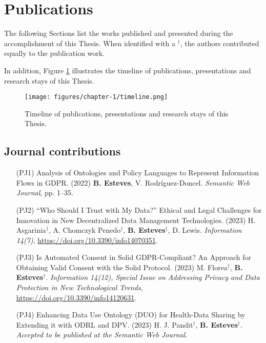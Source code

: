 \section{Publications}
\label{sec:publications}

The following Sections list the works published and presented during the accomplishment of this Thesis. When identified with a $^{\dagger}$, the authors contributed equally to the publication work.

In addition, Figure \ref{fig:timeline} illustrates the timeline of publications, presentations and research stays of this Thesis.

\begin{figure}
    \centering
    \texttt{[image: figures/chapter-1/timeline.png]}
    \caption{Timeline of publications, presentations and research stays of this Thesis.}
    \label{fig:timeline}
\end{figure}

\subsection{Journal contributions}
\label{sec:publications_journal}

\begin{enumerate}
    \item [(PJ1)] Analysis of Ontologies and Policy Languages to Represent Information Flows in GDPR. (2022) \textbf{B. Esteves}, V. Rodríguez-Doncel. \textit{Semantic Web Journal}, pp. 1--35. 
    \item [(PJ2)] ``Who Should I Trust with My Data?'' Ethical and Legal Challenges for Innovation in New Decentralized Data Management Technologies. (2023) H. Asgarinia$^{\dagger}$, A. Chomczyk Penedo$^{\dagger}$, \textbf{B. Esteves}$^{\dagger}$, D. Lewis. \textit{Information 14(7)}, \url{https://doi.org/10.3390/info14070351}.
    \item [(PJ3)] Is Automated Consent in Solid GDPR-Compliant? An Approach for Obtaining Valid Consent with the Solid Protocol. (2023) M. Florea$^{\dagger}$, \textbf{B. Esteves}$^{\dagger}$. \textit{Information 14(12), Special Issue on Addressing Privacy and Data Protection in New Technological Trends}, \url{https://doi.org/10.3390/info14120631}.
    \item [(PJ4)] Enhancing Data Use Ontology (DUO) for Health-Data Sharing by Extending it with ODRL and DPV. (2023) H. J. Pandit$^{\dagger}$, \textbf{B. Esteves}$^{\dagger}$.  \textit{Accepted to be published at the Semantic Web Journal}. 
\end{enumerate}

